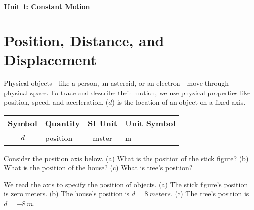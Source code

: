 \documentclass{article}
\begin{document}
\begin{center}
    \textbf{Unit 1: Constant Motion}
\end{center}

\section{Position, Distance, and Displacement} \label{pdfqW3}


Physical objects---like a person, an asteroid, or an electron---move through physical space. To trace and describe their motion, we use physical properties like position, speed, and acceleration.  ($d$) is the location of an object on a fixed axis.

\begin{center}
    \begin{tabular}{cl|cl}
    \hline
    \textbf{Symbol} & \textbf{Quantity} & \textbf{SI Unit} & \textbf{Unit Symbol}  \\
    \hline\hline
        $d$ & position & meter & m\\
    \hline
    \end{tabular}
\end{center}

\begin{example} \label{xNmqo7}
    Consider the position axis below. (a) What is the position of the stick figure? (b) What is the position of the house? (c) What is tree's position? 
\end{example}

\begin{center}
    \captionsetup{type=figure,margin=1in,font=scriptsize}
\end{center}

 We read the axis to specify the position of objects. (a) The stick figure's position is zero meters. (b) The house's position is $d = \SI{8}{meters}$. (c) The tree's position is $d = \SI{-8}{m}$.
\end{document}
